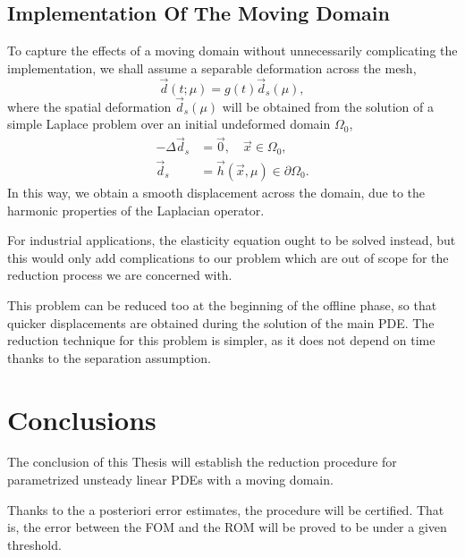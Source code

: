 \documentclass[a4paper, technote, compsoc]{IEEEtran}
\begin{document}
\subsection{Implementation Of The Moving Domain}
To capture the effects of a moving domain without unnecessarily complicating the implementation, we shall assume a separable deformation across the mesh, 
\begin{equation*}
   \vec{d}(t;\mu) = g(t) \vec{d}_s(\mu),
\end{equation*}
where the spatial deformation $\vec{d}_s(\mu)$ will be obtained from the solution of a simple Laplace problem over an initial undeformed domain $\Omega_0$,
\begin{align*}
   -\Delta \vec{d}_s &= \vec{0}, \quad \vec{x} \in \Omega_0, \\
   \vec{d}_s &= \vec{h}(\vec{x}, \mu) \in \partial\Omega_0.
\end{align*}
In this way, we obtain a smooth displacement across the domain, due to the harmonic properties of the Laplacian operator. 

For industrial applications, the elasticity equation ought to be solved instead, but this would only add complications to our problem which are out of scope for the reduction process we are concerned with.

This problem can be reduced too at the beginning of the offline phase, so that quicker displacements are obtained during the solution of the main PDE. 
The reduction technique for this problem is simpler, as it does not depend on time thanks to the separation assumption. 







\section{Conclusions}
\label{sec:conclusions}
The conclusion of this Thesis will establish the reduction procedure for parametrized unsteady linear PDEs with a moving domain.

Thanks to the a posteriori error estimates, the procedure will be certified.
That is, the error between the FOM and the ROM will be proved to be under a given threshold. 
\end{document}
